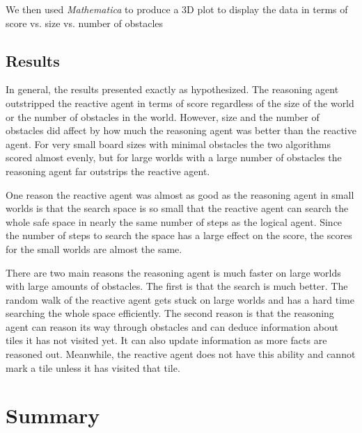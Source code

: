 \documentclass{article}
\begin{document}
	We then used \textit{Mathematica}  to produce a 3D plot to display the data in terms of score vs. size vs. number of obstacles
	
	\subsection{Results}
		In general, the results presented exactly as hypothesized. The reasoning agent outstripped the reactive agent in terms of score regardless of the size of the world or the number of obstacles in the world. 
		However, size and the number of obstacles did affect by how much the reasoning agent was better than the reactive agent. 
		For very small board sizes with minimal obstacles the two algorithms scored almost evenly, but for large worlds with a  large number of obstacles the reasoning agent far outstrips the reactive agent.
		
		One reason the reactive agent was almost as good as the reasoning agent in small worlds is that the search space is so small that the reactive agent can search the whole safe space in nearly the same number of steps as the logical agent.
	 Since the number of steps to search the space has a large effect on the score, the scores for the small worlds are almost the same. 
		
		There are two main reasons the reasoning agent is much faster on large worlds with large amounts of obstacles.
		 The first is that the search is much better.
		  The random walk of the reactive agent gets stuck on large worlds and has a hard time searching the whole space efficiently.
		   The second reason is that the reasoning agent can reason its way through obstacles and can deduce information about tiles it has not visited yet.
		    It can also update information as more facts are reasoned out.
		     Meanwhile, the reactive agent does not have this ability and cannot mark a tile unless it has visited that tile.
	
\section{Summary}



	

	\pagebreak


	
	
	
\end{document}

